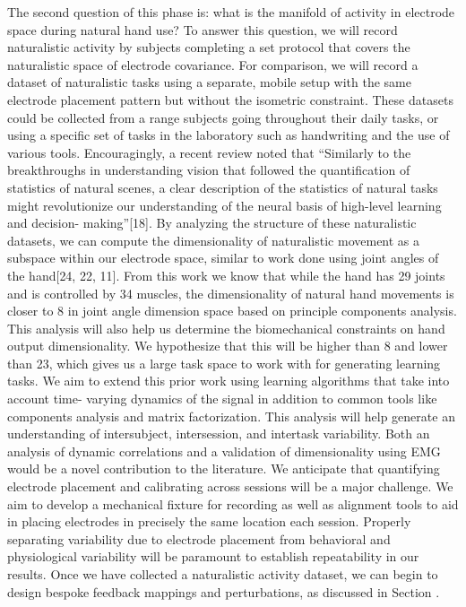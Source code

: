 {            The second question of this phase is: what is the manifold
            of activity in electrode space during natural hand use? To
            answer this question, we will record naturalistic activity
            by subjects completing a set protocol that covers the
            naturalistic space of electrode covariance. For comparison,
            we will record a dataset of naturalistic tasks using a
            separate, mobile setup with the same electrode placement
            pattern but without the isometric constraint. These datasets
            could be collected from a range subjects going throughout
            their daily tasks, or using a specific set of tasks in the
            laboratory such as handwriting and the use of various tools.
            Encouragingly, a recent review noted that ``Similarly to the
            breakthroughs in understanding vision that followed the
            quantification of statistics of natural scenes, a clear
            description of the statistics of natural tasks might
            revolutionize our understanding of the neural basis of
            high-level learning and decision- making''{[}18{]}. By
            analyzing the structure of these naturalistic datasets, we
            can compute the dimensionality of naturalistic movement as a
            subspace within our electrode space, similar to work done
            using joint angles of the hand{[}24, 22, 11{]}. From this
            work we know that while the hand has 29 joints and is
            controlled by 34 muscles, the dimensionality of natural hand
            movements is closer to 8 in joint angle dimension space
            based on principle components analysis. This analysis will
            also help us determine the biomechanical constraints on hand
            output dimensionality. We hypothesize that this will be
            higher than 8 and lower than 23, which gives us a large task
            space to work with for generating learning tasks. We aim to
            extend this prior work using learning algorithms that take
            into account time- varying dynamics of the signal in
            addition to common tools like components analysis and matrix
            factorization. This analysis will help generate an
            understanding of intersubject, intersession, and intertask
            variability. Both an analysis of dynamic correlations and a
            validation of dimensionality using EMG would be a novel
            contribution to the literature. We anticipate that
            quantifying electrode placement and calibrating across
            sessions will be a major challenge. We aim to develop a
            mechanical fixture for recording as well as alignment tools
            to aid in placing electrodes in precisely the same location
            each session. Properly separating variability due to
            electrode placement from behavioral and physiological
            variability will be paramount to establish repeatability in
            our results. Once we have collected a naturalistic activity
            dataset, we can begin to design bespoke feedback mappings
            and perturbations, as discussed in Section .

}
